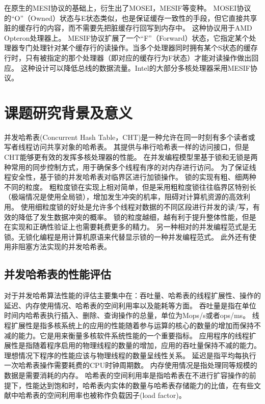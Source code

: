 在原生的MESI协议的基础上，衍生出了MOSEI，MESIF等变种。
MOSEI协议的“O”（Owned）状态与E状态类似，也是保证缓存一致性的手段，但它直接共享脏的缓存行的内容，而不需要先把脏缓存行回写到内存中。
这种协议用于AMD Opteron处理器上。
MESIF协议扩展了一个“F”（Forward）状态，它指定某个处理器专门处理针对某个缓存行的读操作。当多个处理器同时拥有某个S状态的缓存行时，只有被指定的那个处理器（即对应的缓存行为F状态）才能对读操作做出回应。
这种设计可以降低总线的数据流量。Intel的大部分多核处理器采用MESIF协议。 

\section{课题研究背景及意义}

并发哈希表(Concurrent Hash Table，CHT)是一种允许在同一时刻有多个读者或写者线程访问共享对象的哈希表。
其提供与串行哈希表一样的访问接口，但是CHT能够更有效的发挥多核处理器的性能。
在并发编程模型里基于锁和无锁是两种常用的同步控制方式，用于确保多个线程有序的对内存进行访问。
为了保证线程安全性，基于锁的并发哈希表对临界区进行加锁操作。
锁的实现有粗、细两种不同的粒度。
粗粒度锁在实现上相对简单，但是采用粗粒度锁往往临界区特别长（极端情况是使用全局锁），增加发生冲突的机率，阻碍对计算机资源的高效利用。
使用细粒度锁的好处是允许多个线程对数据的不同区段进行并发的读/写，有效的降低了发生数据冲突的概率。
锁的粒度越细，越有利于提升整体性能，但是在实现和正确性验证上也需要耗费更多的精力。
另一种相对的并发编程范式是无锁。无锁化编程是用计算机原语来代替显示锁的一种并发编程范式。
此外还有使用非阻塞方法实现的并发哈希表\cite{nonblocking,clht,shalev2006split}。

\subsection{并发哈希表的性能评估}
 
对于并发哈希算法性能的评估主要集中在：吞吐量、哈希表的线程扩展性、操作的延迟、内存使用情况、哈希表的空间利用率以及能耗等方面。
吞吐量是指在单位时间内哈希表执行插入、删除、查询操作的总量，单位为Mops/s或者ops/ms。
线程扩展性是指多核系统上的应用的性能随着参与运算的核心的数量的增加而保持不减的能力。它是用来衡量多核软件系统性能的一个重要指标。
应用程序的线程扩展性是指随着程序启用的物理线程的数量的增加，应用的吞吐量保持不减的能力。
理想情况下程序的性能应该与物理线程的数量呈线性关系。
延迟是指平均每执行一次哈希表操作需要耗费的CPU时钟周期数。
内存使用情况是指处理同等规模的数据是需要消耗的内存。
哈希表的空间利用率是指哈希表在不进行扩容操作的前提下，性能达到饱和时，哈希表内实体的数量与哈希表存储能力的比值，在有些文献中哈希表的空间利用率也被称作负载因子(load factor)。

